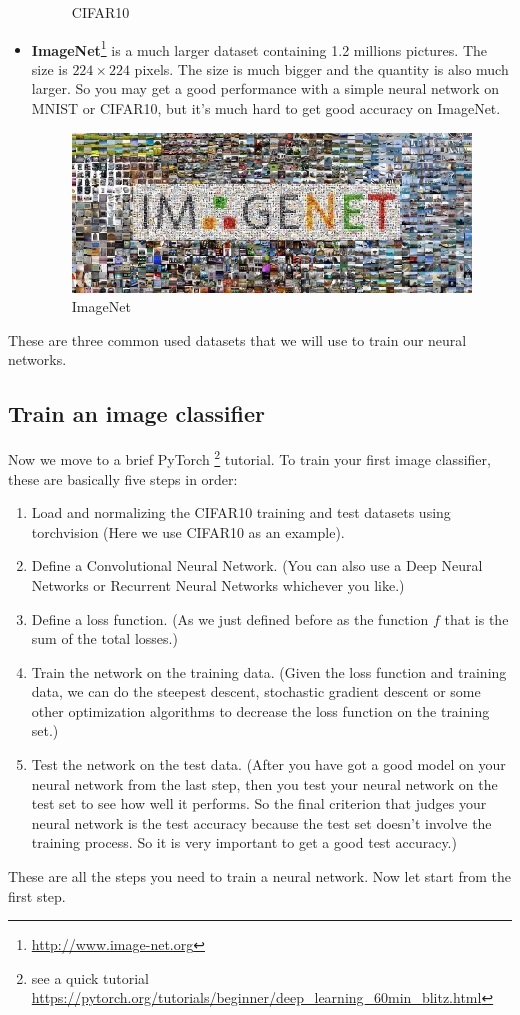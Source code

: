 \begin{itemize}
\begin{figure}
\caption{CIFAR10}
\end{figure}
\item {\bf ImageNet}\footnote{\url{http://www.image-net.org}} is a much larger dataset containing 1.2 millions pictures. The size is $224\times 224$ pixels. The size is much bigger and the quantity is also much larger. So you may get a good performance with a simple neural network on MNIST or CIFAR10, but it's much hard to get good accuracy on ImageNet. %
\begin{figure}[H]
\centering
\includegraphics[scale=0.4]{./figures/497Proj_imagenet}
\caption{ImageNet}
\end{figure}
\end{itemize}
These are three common used datasets that we will use to train our neural networks. 

\subsection{Train an image classifier}
Now we move to a brief PyTorch \footnote{see a quick tutorial \url{https://pytorch.org/tutorials/beginner/deep_learning_60min_blitz.html}} tutorial. To train your first image classifier, these are basically five steps in order:
\begin{enumerate}
\item Load and normalizing the CIFAR10 training and test datasets using torchvision (Here we use CIFAR10 as an example).
\item Define a Convolutional Neural Network. (You can also use a Deep Neural Networks or Recurrent Neural Networks whichever you like.)
\item Define a loss function. (As we just defined before as the function $f$ that is the sum of the total losses.) 
\item Train the network on the training data. (Given the loss function and training data, we can do the steepest descent, stochastic gradient descent or some other optimization algorithms to decrease the loss function on the training set.)
\item Test the network on the test data. (After you have got a good model on your neural network from the last step, then you test your neural network on the test set to see how well it performs. So the final criterion that judges your neural network is the test accuracy because the test set doesn't involve the training process. So it is very important to get a good test accuracy.)
\end{enumerate}
These are all the steps you need to train a neural network. Now let start from the first step.

